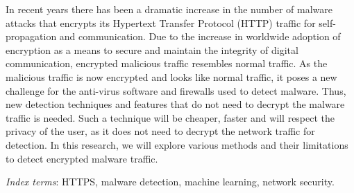 In recent years there has been a dramatic increase in the number of malware attacks that encrypts its Hypertext Transfer Protocol (HTTP) traffic for self-propagation and communication. Due to the increase in worldwide adoption of encryption as a means to secure and maintain the integrity of digital communication, encrypted malicious traffic resembles normal traffic. As the malicious traffic is now encrypted and looks like normal traffic, it poses a new challenge for the anti-virus software and firewalls used to detect malware. Thus, new detection techniques and features that do not need to decrypt the malware traffic is needed. Such a technique will be cheaper, faster and will respect the privacy of the user, as it does not need to decrypt the network traffic for detection. In this research, we will explore various methods and their limitations to detect encrypted malware traffic.

\emph{Index terms}: HTTPS, malware detection, machine learning, network security.